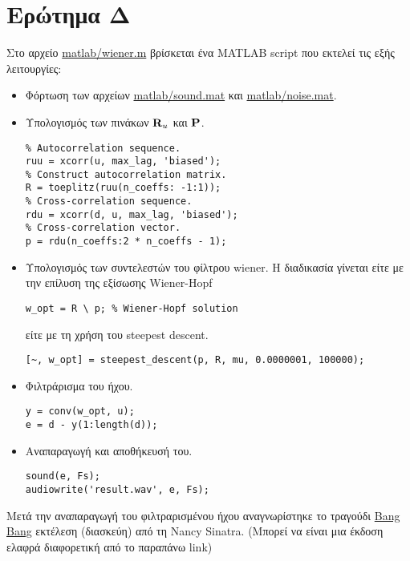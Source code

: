 \section{Ερώτημα Δ}
Στο αρχείο \url{matlab/wiener.m} βρίσκεται ένα MATLAB script που εκτελεί τις εξής λειτουργίες:
\begin{itemize}
\item Φόρτωση των αρχείων \url{matlab/sound.mat} και \url{matlab/noise.mat}.
\item Υπολογισμός των πινάκων $\mathbf{R}_u$ και $\mathbf{P}$.
\begin{lstlisting}[style=chunk]
%% Calculate needed values.
% Αutocorrelation sequence.
ruu = xcorr(u, max_lag, 'biased');
% Construct autocorrelation matrix.
R = toeplitz(ruu(n_coeffs: -1:1));
% Cross-correlation sequence.
rdu = xcorr(d, u, max_lag, 'biased');
% Cross-correlation vector.
p = rdu(n_coeffs:2 * n_coeffs - 1);
\end{lstlisting}
\item Υπολογισμός των συντελεστών του φίλτρου wiener.
Η διαδικασία γίνεται είτε με την επίλυση της εξίσωσης Wiener-Hopf
\begin{lstlisting}[style=chunk]
w_opt = R \ p; % Wiener-Hopf solution
\end{lstlisting}
είτε με τη χρήση του steepest descent.
\begin{lstlisting}[style=chunk]
[~, w_opt] = steepest_descent(p, R, mu, 0.0000001, 100000);
\end{lstlisting}
\item Φιλτράρισμα του ήχου.
\begin{lstlisting}[style=chunk]
%% Filter sound.
y = conv(w_opt, u);
e = d - y(1:length(d));
\end{lstlisting}
\item Αναπαραγωγή και αποθήκευσή του.
\begin{lstlisting}[style=chunk]
%% Play result.
sound(e, Fs);
audiowrite('result.wav', e, Fs);
\end{lstlisting}
\end{itemize}
Μετά την αναπαραγωγή του φιλτραρισμένου ήχου αναγνωρίστηκε το τραγούδι \href{https://youtu.be/xSHYlSxQyJM}{Bang Bang} εκτέλεση (διασκεύη) από τη Nancy Sinatra. (Μπορεί να είναι μια έκδοση ελαφρά διαφορετική από το παραπάνω link)
